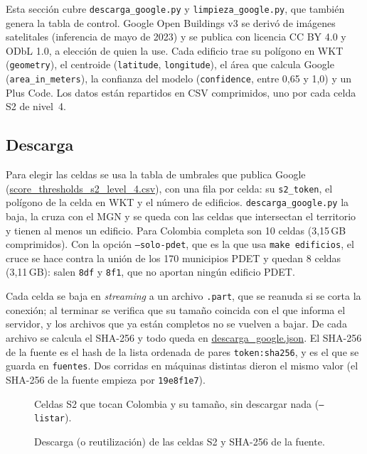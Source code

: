 \documentclass[11pt,a4paper]{article}
\newcommand{\campo}[1]{\texttt{#1}}
\newcommand{\ruta}[1]{\begingroup\urlstyle{tt}\url{#1}\endgroup}
\begin{document}
Esta sección cubre \campo{descarga\_google.py} y \campo{limpieza\_google.py},
que también genera la tabla de control. Google Open Buildings v3 se derivó de
imágenes satelitales (inferencia de mayo de 2023) y se publica con licencia
CC BY 4.0 y ODbL 1.0, a elección de quien la use. Cada edificio trae su
polígono en WKT (\campo{geometry}), el centroide (\campo{latitude},
\campo{longitude}), el área que calcula Google (\campo{area\_in\_meters}), la
confianza del modelo (\campo{confidence}, entre 0,65 y 1,0) y un Plus Code. Los
datos están repartidos en CSV comprimidos, uno por cada celda S2 de nivel~4.

\subsection{Descarga}
\label{sec:g-descarga}

Para elegir las celdas se usa la tabla de umbrales que publica Google
(\ruta{score_thresholds_s2_level_4.csv}), con una fila por celda: su
\campo{s2\_token}, el polígono de la celda en WKT y el número de edificios.
\campo{descarga\_google.py} la baja, la cruza con el MGN y se queda con las
celdas que intersectan el territorio y tienen al menos un edificio. Para
Colombia completa son 10 celdas (3,15\,GB comprimidos). Con la opción
\texttt{--solo-pdet}, que es la que usa \campo{make edificios}, el cruce se hace
contra la unión de los 170 municipios PDET y quedan 8 celdas (3,11\,GB): salen
\campo{8df} y \campo{8f1}, que no aportan ningún edificio PDET.

Cada celda se baja en \emph{streaming} a un archivo \campo{.part}, que se
reanuda si se corta la conexión; al terminar se verifica que su tamaño
coincida con el que informa el servidor, y los archivos que ya están completos
no se vuelven a bajar. De cada archivo se calcula el SHA-256 y todo queda en
\ruta{descarga_google.json}. El SHA-256 de la fuente es el hash de la lista
ordenada de pares \campo{token:sha256}, y es el que se guarda en
\campo{fuentes}. Dos corridas en máquinas distintas dieron el mismo valor (el
SHA-256 de la fuente empieza por \texttt{19e8f1e7}).

\begin{figure}[H]
  \centering
  \caption{Celdas S2 que tocan Colombia y su tamaño, sin descargar nada
  (\texttt{--listar}).}
  \label{fig:g-listar}
\end{figure}

\begin{figure}[H]
  \centering
  \caption{Descarga (o reutilización) de las celdas S2 y SHA-256 de la fuente.}
  \label{fig:g-descarga}
\end{figure}
\end{document}
